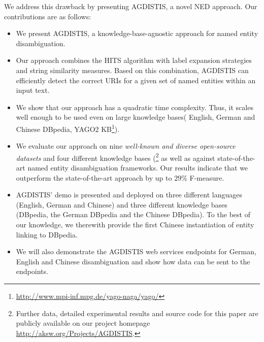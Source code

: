 We address this drawback by presenting AGDISTIS,  a novel \ac{NED} approach. Our contributions are as follows:
\begin{itemize}
\item We present AGDISTIS, a knowledge-base-agnostic approach for named entity disambiguation.
\item Our approach combines the \ac{HITS} algorithm with label expansion strategies and string similarity measures.
Based on this combination, AGDISTIS can efficiently detect the correct URIs for a given set of named entities within an input text. 
\item We show that our approach has a quadratic time complexity. Thus, it scales well enough to be used even on large knowledge bases( English, German and Chinese DBpedia, YAGO2 \ac{KB}\footnote{\url{http://www.mpi-inf.mpg.de/yago-naga/yago/}}).
\item We evaluate our approach on nine \emph{well-known and diverse open-source datasets} and four different knowledge bases (\footnote{Further data, detailed experimental results and source code for this paper are publicly available on our project homepage \url{http://aksw.org/Projects/AGDISTIS}.} as well as against state-of-the-art named entity disambiguation frameworks.
Our results indicate that we outperform the state-of-the-art approach by up to $29\%$ F-measure.
\item AGDISTIS' demo is presented and deployed on three different languages (English, German and Chinese) and three different knowledge bases (DBpedia, the German DBpedia and the Chinese DBpedia).
To the best of our knowledge, we therewith provide the first Chinese instantiation of entity linking to DBpedia.
\item We will also demonstrate the AGDISTIS web services endpoints for German, English and Chinese disambiguation and show how data can be sent to the endpoints.
\end{itemize}



